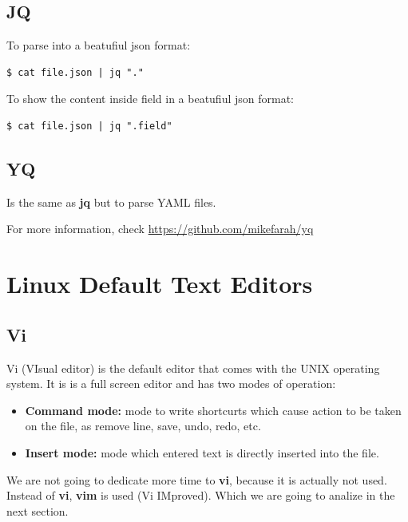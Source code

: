 \documentclass{article}
\newenvironment{codetemplate}[1][]{%
  \mybasecolorbox[#1]
  \itshape
}{%
  \endmybasecolorbox
}
\begin{document}
\subsection{JQ}

To parse into a beatufiul json format:
\begin{codetemplate}{}
\begin{verbatim}
$ cat file.json | jq "."
\end{verbatim}
\end{codetemplate}

To show the content inside field in a beatufiul json format:
\begin{codetemplate}{}
\begin{verbatim}
$ cat file.json | jq ".field"
\end{verbatim}
\end{codetemplate}

\subsection{YQ}

Is the same as \textbf{jq} but to parse YAML files.

For more information, check \url{https://github.com/mikefarah/yq}

\newpage
\section{Linux Default Text Editors}
\subsection{Vi}
Vi (VIsual editor) is the default editor that comes with the UNIX operating system. It is is a full screen editor and has two modes of operation:

\begin{itemize}
    \item \textbf{Command mode:} mode to write shortcurts which cause action to be taken on the file, as remove line, save, undo, redo, etc.
    \item \textbf{Insert mode:} mode which entered text is directly inserted into the file.
\end{itemize}

We are not going to dedicate more time to \textbf{vi}, because it is actually not used. Instead of \textbf{vi}, \textbf{vim} is used (Vi IMproved). Which we are going to analize in the next section.
\end{document}
